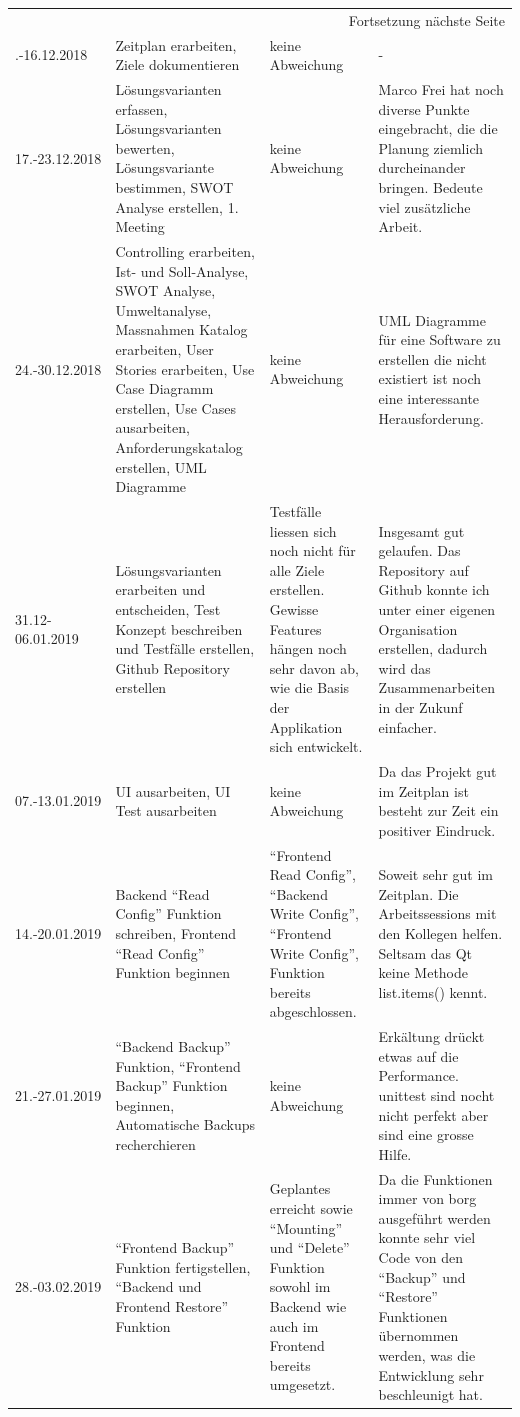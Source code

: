 \begin{landscape}
\begin{longtable}{|p{2cm}|p{5cm}|p{5cm}|p{7cm}|}
\hline
\endhead
\hline\multicolumn{4}{r}{Fortsetzung nächste Seite} \\
\endfoot
\endlastfoot
\hline
10.-16.12.2018 & Zeitplan erarbeiten, Ziele dokumentieren & keine Abweichung & -\\
\hline
17.-23.12.2018 & Lösungsvarianten erfassen, Lösungsvarianten bewerten, Lösungsvariante bestimmen, SWOT Analyse erstellen, 1. Meeting & keine Abweichung & Marco Frei hat noch diverse Punkte eingebracht, die die Planung ziemlich durcheinander bringen. Bedeute viel zusätzliche Arbeit.\\
\hline
24.-30.12.2018 & Controlling erarbeiten, Ist- und Soll-Analyse, SWOT Analyse, Umweltanalyse, Massnahmen Katalog erarbeiten, User Stories erarbeiten, Use Case Diagramm erstellen, Use Cases ausarbeiten, Anforderungskatalog erstellen, UML Diagramme & keine Abweichung & UML Diagramme für eine Software zu erstellen die nicht existiert ist noch eine interessante Herausforderung.\\
\hline
31.12-06.01.2019 & Lösungsvarianten erarbeiten und entscheiden, Test Konzept beschreiben und Testfälle erstellen, Github Repository erstellen & Testfälle liessen sich noch nicht für alle Ziele erstellen. Gewisse Features hängen noch sehr davon ab, wie die Basis der Applikation sich entwickelt. & Insgesamt gut gelaufen. Das Repository auf Github konnte ich unter einer eigenen Organisation erstellen, dadurch wird das Zusammenarbeiten in der Zukunf einfacher.\\
\hline
07.-13.01.2019 & UI ausarbeiten, UI Test ausarbeiten & keine Abweichung & Da das Projekt gut im Zeitplan ist besteht zur Zeit ein positiver Eindruck.\\
\hline
14.-20.01.2019 & Backend "`Read Config"' Funktion schreiben, Frontend "`Read Config"'  Funktion beginnen & "`Frontend Read Config"', "`Backend Write Config"', "`Frontend Write Config"', Funktion bereits abgeschlossen. & Soweit sehr gut im Zeitplan. Die Arbeitssessions mit den Kollegen helfen. Seltsam das Qt keine Methode list.items() kennt.\\
\hline
21.-27.01.2019 & "`Backend Backup"' Funktion, "`Frontend Backup"' Funktion beginnen, Automatische Backups recherchieren & keine Abweichung & Erkältung drückt etwas auf die Performance. \gls{unittest} sind nocht nicht perfekt aber sind eine grosse Hilfe.\\
\hline
28.-03.02.2019 & "`Frontend Backup"' Funktion fertigstellen, "`Backend und Frontend Restore"' Funktion & Geplantes erreicht sowie "`Mounting"' und "`Delete"' Funktion sowohl im Backend wie auch im Frontend bereits umgesetzt. & Da die Funktionen immer von \gls{borg} ausgeführt werden konnte sehr viel Code von den "`Backup"' und "`Restore"' Funktionen übernommen werden, was die Entwicklung sehr beschleunigt hat.\\

\end{longtable}
\end{landscape}
